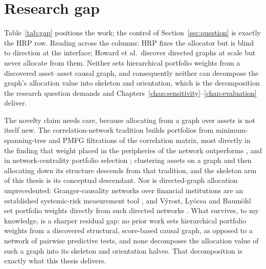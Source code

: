 \section{Research gap}
\label{sec:gap}

Table~\ref{tab:gap} positions the work; the \HRP{} control of
Section~\ref{sec:question} is exactly the HRP row. Reading across the
columns: HRP fixes the allocator but is blind to direction at the interface;
Howard et al.\
discover directed graphs at scale but never allocate from them. Neither
sets hierarchical portfolio weights from a discovered asset--asset
causal graph, and consequently neither can decompose the graph's allocation
value into skeleton and orientation, which is the decomposition the research
question demands and
Chapters~\ref{chap:sensitivity}--\ref{chap:evaluation} deliver.

The novelty claim needs care, because allocating from a graph over assets is
not itself new. The correlation-network tradition builds portfolios from
minimum-spanning-tree and PMFG filtrations of the correlation matrix, most
directly in the finding that weight placed in the peripheries of the network
outperforms \cite{pozzi2013spread}, and in network-centrality portfolio
selection \cite{peralta2016network}; clustering assets on a graph and then
allocating down its structure descends from that tradition, and the skeleton
arm of this thesis is its conceptual descendant. Nor is directed-graph
allocation unprecedented: Granger-causality networks over financial
institutions are an established systemic-risk measurement tool
\cite{billio2012econometric}, and V\'yrost, Ly\'ocsa and Baum\"ohl set
portfolio weights directly from such directed networks \cite{vyrost2019network}.
What survives, to my knowledge, is a sharper residual gap: no prior work sets
hierarchical portfolio weights from a discovered structural, score-based
causal graph, as opposed to a network of pairwise predictive tests, and none
decomposes the allocation value of such a graph into its skeleton and
orientation halves. That decomposition is exactly what this thesis delivers.

